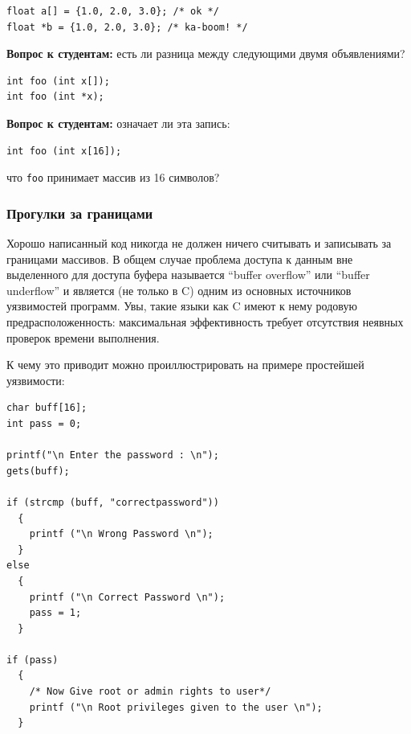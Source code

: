 \documentclass[a4paper,12pt,oneside]{article}
\newif\ifanswers
\begin{document}
\begin{lstlisting}
float a[] = {1.0, 2.0, 3.0}; /* ok */
float *b = {1.0, 2.0, 3.0}; /* ka-boom! */
\end{lstlisting}

\textbf{Вопрос к студентам:} есть ли разница между следующими двумя объявлениями?

\begin{lstlisting}
int foo (int x[]);
int foo (int *x);
\end{lstlisting}

\ifanswers
Ответ: из-за decaying разницы нет.
\fi

\textbf{Вопрос к студентам:} означает ли эта запись:

\begin{lstlisting}
int foo (int x[16]);
\end{lstlisting}

что \lstinline!foo! принимает массив из 16 символов?

\ifanswers
Ответ: нет, здесь \lstinline!foo! принимает любой указатель.
\fi

\subsubsection{Прогулки за границами}\label{subsub:overruns}

Хорошо написанный код никогда не должен ничего считывать и записывать за границами массивов. В общем случае проблема доступа к данным вне выделенного для доступа буфера называется ``buffer overflow'' или ``buffer underflow'' и является (не только в C) одним из основных источников уязвимостей программ. Увы, такие языки как C имеют к нему родовую предрасположенность: максимальная эффективность требует отсутствия неявных проверок времени выполнения.

К чему это приводит можно проиллюстрировать на примере простейшей уязвимости:

\begin{lstlisting}
char buff[16];
int pass = 0;

printf("\n Enter the password : \n");
gets(buff);

if (strcmp (buff, "correctpassword"))
  {
    printf ("\n Wrong Password \n");
  }
else
  {
    printf ("\n Correct Password \n");
    pass = 1;
  }

if (pass)
  {
    /* Now Give root or admin rights to user*/
    printf ("\n Root privileges given to the user \n");
  }
\end{lstlisting}
\end{document}
